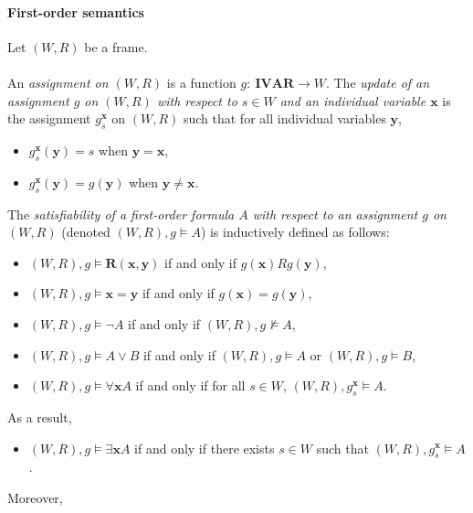 \documentclass[draft]{article}
\def\IVAR{\mathbf{IVAR}}
\begin{document}
\paragraph{First-order semantics}
%
%
Let $(W,R)$ be a frame.
%
%
\\
\\
%
%
An {\it assignment on $(W,R)$}\/ is a function $g:\ \IVAR{\longrightarrow}W$.
The {\it update of an assignment $g$ on $(W,R)$ with respect to $s{\in}W$ and an individual variable $\mathbf{x}$}\/ is the assignment $g_{s}^{\mathbf{x}}$ on $(W,R)$ such that for all individual variables $\mathbf{y}$,
%
%
\begin{itemize}
%
%
\item $g_{s}^{\mathbf{x}}(\mathbf{y}){=}s$ when $\mathbf{y}{=}\mathbf{x}$,
%
%
\item $g_{s}^{\mathbf{x}}(\mathbf{y}){=}g(\mathbf{y})$ when $\mathbf{y}{\not=}\mathbf{x}$.
%
%
\end{itemize}
%
%
The {\it satisfiability of a first-order formula $A$ with respect to an assignment $g$ on $(W,R)$}\/ (denoted $(W,R),g\models A$) is inductively defined as follows:
%
%
\begin{itemize}
%
%
\item $(W,R),g{\models}\mathbf{R}(\mathbf{x},\mathbf{y})$ if and only if $g(\mathbf{x}){R}g(\mathbf{y})$,
%
%
\item $(W,R),g{\models}\mathbf{x}{=}\mathbf{y}$ if and only if $g(\mathbf{x}){=}g(\mathbf{y})$,
%
%
%
%
\item $(W,R),g{\models}\neg A$ if and only if $(W,R),g{\not\models}A$,
%
%
\item $(W,R),g{\models}A\vee B$ if and only if $(W,R),g{\models}A$ or $(W,R),g{\models}B$,
%
%
\item $(W,R),g{\models}\forall\mathbf{x}A$ if and only if for all $s{\in}W$, $(W,R),g_{s}^{\mathbf{x}}{\models}A$.
%
%
\end{itemize}
%
%
As a result,
%
%
\begin{itemize}
%
%
\item $(W,R),g{\models}\exists\mathbf{x}A$ if and only if there exists $s{\in}W$ such that $(W,R),g_{s}^{\mathbf{x}}{\models}A$.
%
%
\end{itemize}
%
%
Moreover,
%
%
\end{document}
